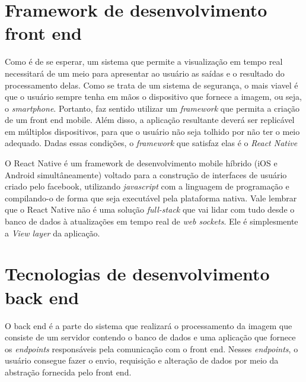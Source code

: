 \documentclass[12pt, %
openright, 
oneside, %
a4paper,    %
brazil]{facom-ufu-abntex2}
\begin{document}
\section{Framework de desenvolvimento front end}

Como é de se esperar, um sistema que permite a visualização em tempo real
necessitará de um meio para apresentar ao usuário as saídas e o resultado do
processamento delas. Como se trata de um sistema de segurança, o mais viavel é
que o usuário sempre tenha em mãos o dispositivo que fornece a imagem, ou seja,
o \emph{smartphone}. Portanto, faz sentido utilizar um \emph{framework} que
permita a criação de um front end mobile. Além disso, a aplicação resultante
deverá ser replicável em múltiplos dispositivos, para que o usuário não seja
tolhido por não ter o meio adequado. Dadas essas condições, o \emph{framework}
que satisfaz elas é o \emph{React Native}

O React Native é um framework de desenvolvimento mobile híbrido (iOS e Android
simultâneamente) voltado para a construção de interfaces de usuário criado pelo
facebook, utilizando \emph{javascript} com a linguagem de programação e
compilando-o de forma que seja executável pela plataforma nativa. Vale lembrar
que o React Native não é uma solução \emph{full-stack} que vai lidar com tudo
desde o banco de dados à atualizações em tempo real de \emph{web sockets}. Ele
é simplesmente a \emph{View layer} da aplicação. \cite{boduch2017react}

\section{Tecnologias de desenvolvimento back end}

O back end é a parte do sistema que realizará o processamento da imagem que
consiste de um servidor contendo o banco de dados e uma aplicação que fornece
os \emph{endpoints} responsáveis pela comunicação com o front end. Nesses
\emph{endpoints}, o usuário consegue fazer o envio, requisição e alteração de
dados por meio da abstração fornecida pelo front end.

\end{document}

